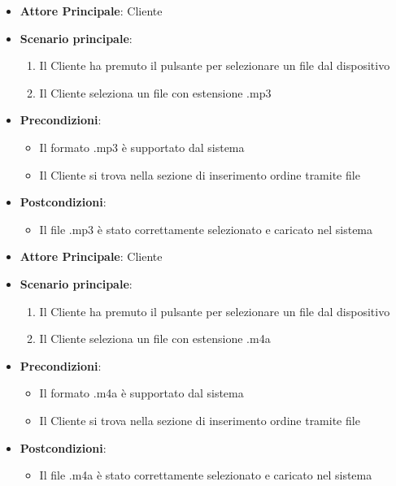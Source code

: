 \begin{itemize}
    \item \textbf{Attore Principale}: Cliente
    \item \textbf{Scenario principale}:
        \begin{enumerate}
            \item Il Cliente ha premuto il pulsante per selezionare un file dal dispositivo
            \item Il Cliente seleziona un file con estensione .mp3
        \end{enumerate}
    \item \textbf{Precondizioni}:
        \begin{itemize}
            \item Il formato .mp3 è supportato dal sistema
            \item Il Cliente si trova nella sezione di inserimento ordine tramite file
        \end{itemize}
    \item \textbf{Postcondizioni}: 
        \begin{itemize}
            \item Il file .mp3 è stato correttamente selezionato e caricato nel sistema
        \end{itemize}
\end{itemize}

\label{uc_13.2.2}

\begin{itemize}
    \item \textbf{Attore Principale}: Cliente
    \item \textbf{Scenario principale}:
        \begin{enumerate}
            \item Il Cliente ha premuto il pulsante per selezionare un file dal dispositivo
            \item Il Cliente seleziona un file con estensione .m4a
        \end{enumerate}
    \item \textbf{Precondizioni}:
        \begin{itemize}
            \item Il formato .m4a è supportato dal sistema
            \item Il Cliente si trova nella sezione di inserimento ordine tramite file
        \end{itemize}
    \item \textbf{Postcondizioni}: 
        \begin{itemize}
            \item Il file .m4a è stato correttamente selezionato e caricato nel sistema
        \end{itemize}
\end{itemize}

